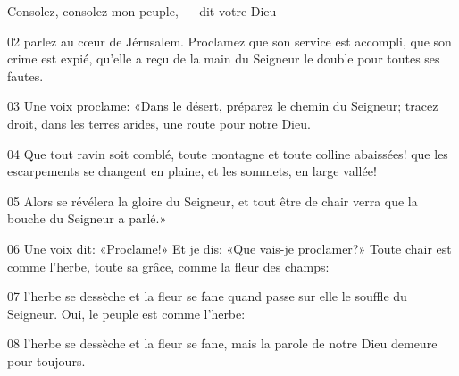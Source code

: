 Consolez, consolez mon peuple, --- dit votre Dieu ---

02 parlez au cœur de Jérusalem. Proclamez que son service est accompli, que son crime est expié, qu’elle a reçu de la main du Seigneur le double pour toutes ses fautes.

03 Une voix proclame: «Dans le désert, préparez le chemin du Seigneur; tracez droit, dans les terres arides, une route pour notre Dieu.

04 Que tout ravin soit comblé, toute montagne et toute colline abaissées! que les escarpements se changent en plaine, et les sommets, en large vallée!

05 Alors se révélera la gloire du Seigneur, et tout être de chair verra que la bouche du Seigneur a parlé.»

06 Une voix dit: «Proclame!» Et je dis: «Que vais-je proclamer?» Toute chair est comme l’herbe, toute sa grâce, comme la fleur des champs:

07 l’herbe se dessèche et la fleur se fane quand passe sur elle le souffle du Seigneur. Oui, le peuple est comme l’herbe:

08 l’herbe se dessèche et la fleur se fane, mais la parole de notre Dieu demeure pour toujours.